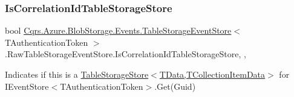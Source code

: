 \subsubsection{\texorpdfstring{Is\+Correlation\+Id\+Table\+Storage\+Store}{IsCorrelationIdTableStorageStore}}
{\footnotesize\ttfamily bool \hyperlink{classCqrs_1_1Azure_1_1BlobStorage_1_1Events_1_1TableStorageEventStore}{Cqrs.\+Azure.\+Blob\+Storage.\+Events.\+Table\+Storage\+Event\+Store}$<$ T\+Authentication\+Token $>$.Raw\+Table\+Storage\+Event\+Store.\+Is\+Correlation\+Id\+Table\+Storage\+Store\hspace{0.3cm}{\ttfamily [get]}, {\ttfamily [set]}, {\ttfamily [protected]}}



Indicates if this is a \hyperlink{classCqrs_1_1Azure_1_1BlobStorage_1_1TableStorageStore_aabc36bc46ffb22b716cc7769a641cfab_aabc36bc46ffb22b716cc7769a641cfab}{Table\+Storage\+Store$<$\+T\+Data,\+T\+Collection\+Item\+Data$>$} for I\+Event\+Store$<$\+T\+Authentication\+Token$>$.\+Get(\+Guid) 

